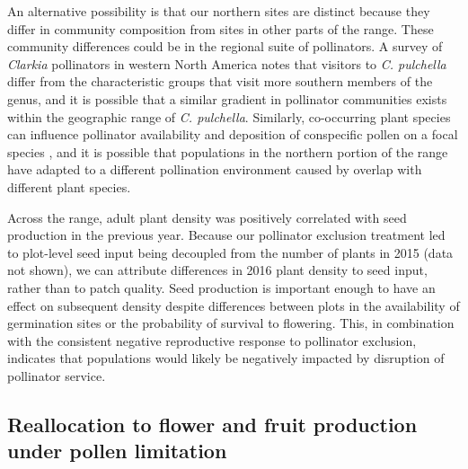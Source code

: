 \documentclass{article}
\begin{document}
An alternative possibility is that our northern sites are distinct because they differ in community composition from sites in other parts of the range. These community differences could be in the regional suite of pollinators. A survey of \textit{Clarkia} pollinators in western North America \citep{macswain1973comparative} notes that visitors to \textit{C. pulchella} differ from the characteristic groups that visit more southern members of the genus, and it is possible that a similar gradient in pollinator communities exists within the geographic range of \textit{C. pulchella}. Similarly, co-occurring plant species can influence pollinator availability and deposition of conspecific pollen on a focal species \citep{palladini2013indirect}, and it is possible that populations in the northern portion of the range have adapted to a different pollination environment caused by overlap with different plant species.

Across the range, adult plant density was positively correlated with seed production in the previous year. Because our pollinator exclusion treatment led to plot-level seed input being decoupled from the number of plants in 2015 (data not shown), we can attribute differences in 2016 plant density to seed input, rather than to patch quality. Seed production is important enough to have an effect on subsequent density despite differences between plots in the availability of germination sites or the probability of survival to flowering. This, in combination with the consistent negative reproductive response to pollinator exclusion, indicates that populations would likely be negatively impacted by disruption of pollinator service. 

\subsection*{Reallocation to flower and fruit production under pollen limitation}
\end{document}
